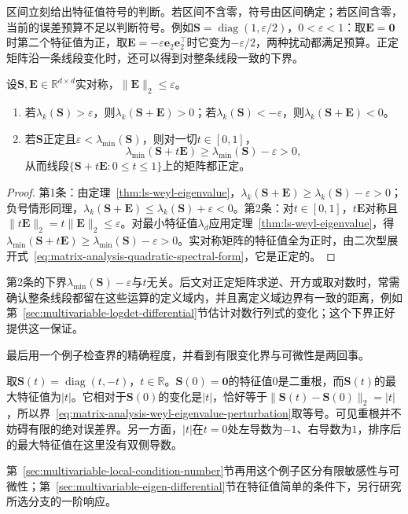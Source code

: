 区间立刻给出特征值符号的判断。若区间不含零，符号由区间确定；若区间含零，当前的误差预算不足以判断符号。例如$\bm S=\operatorname{diag}(1,\varepsilon/2)$，$0<\varepsilon<1$：取$\bm E=\bm0$时第二个特征值为正，取$\bm E=-\varepsilon\bm e_2\bm e_2^\top$时它变为$-\varepsilon/2$，两种扰动都满足预算。正定矩阵沿一条线段变化时，还可以得到对整条线段一致的下界。
\begin{theorem}[特征值的符号与正定性保持]
\label{thm:ls-eigenvalue-sign-definiteness}
设$\bm S,\bm E\in\mathbb R^{d\times d}$实对称，$\lVert\bm E\rVert_2\leq\varepsilon$。
\begin{enumerate}
 \item 若$\lambda_k(\bm S)>\varepsilon$，则$\lambda_k(\bm S+\bm E)>0$；若$\lambda_k(\bm S)<-\varepsilon$，则$\lambda_k(\bm S+\bm E)<0$。
 \item 若$\bm S$正定且$\varepsilon<\lambda_{\min}(\bm S)$，则对一切$t\in[0,1]$，
 \[
  \lambda_{\min}(\bm S+t\bm E)\geq\lambda_{\min}(\bm S)-\varepsilon>0 ,
 \]
 从而线段$\{\bm S+t\bm E:0\leq t\leq1\}$上的矩阵都正定。
\end{enumerate}
\end{theorem}
\begin{proof}
第1条：由定理~\ref{thm:ls-weyl-eigenvalue}，$\lambda_k(\bm S+\bm E)\geq\lambda_k(\bm S)-\varepsilon>0$；负号情形同理，$\lambda_k(\bm S+\bm E)\leq\lambda_k(\bm S)+\varepsilon<0$。第2条：对$t\in[0,1]$，$t\bm E$对称且$\lVert t\bm E\rVert_2=t\lVert\bm E\rVert_2\leq\varepsilon$。对最小特征值$\lambda_d$应用定理~\ref{thm:ls-weyl-eigenvalue}，得$\lambda_{\min}(\bm S+t\bm E)\geq\lambda_{\min}(\bm S)-\varepsilon>0$。实对称矩阵的特征值全为正时，由二次型展开式~\eqref{eq:matrix-analysis-quadratic-spectral-form}，它是正定的。
\end{proof}
第2条的下界$\lambda_{\min}(\bm S)-\varepsilon$与$t$无关。后文对正定矩阵求逆、开方或取对数时，常需确认整条线段都留在这些运算的定义域内，并且离定义域边界有一致的距离，例如第~\ref{sec:multivariable-logdet-differential}节估计对数行列式的变化；这个下界正好提供这一保证。

最后用一个例子检查界的精确程度，并看到有限变化界与可微性是两回事。
\begin{example}[重根处的最大特征值]
\label{ex:ls-weyl-double-root}
取$\bm S(t)=\operatorname{diag}(t,-t)$，$t\in\mathbb R$。$\bm S(0)=\bm0$的特征值$0$是二重根，而$\bm S(t)$的最大特征值为$|t|$。它相对于$\bm S(0)$的变化是$|t|$，恰好等于$\lVert\bm S(t)-\bm S(0)\rVert_2=|t|$，所以界~\eqref{eq:matrix-analysis-weyl-eigenvalue-perturbation}取等号。可见重根并不妨碍有限的绝对误差界。另一方面，$|t|$在$t=0$处左导数为$-1$、右导数为$1$，排序后的最大特征值在这里没有双侧导数。
\end{example}
第~\ref{sec:multivariable-local-condition-number}节再用这个例子区分有限敏感性与可微性；第~\ref{sec:multivariable-eigen-differential}节在特征值简单的条件下，另行研究所选分支的一阶响应。

